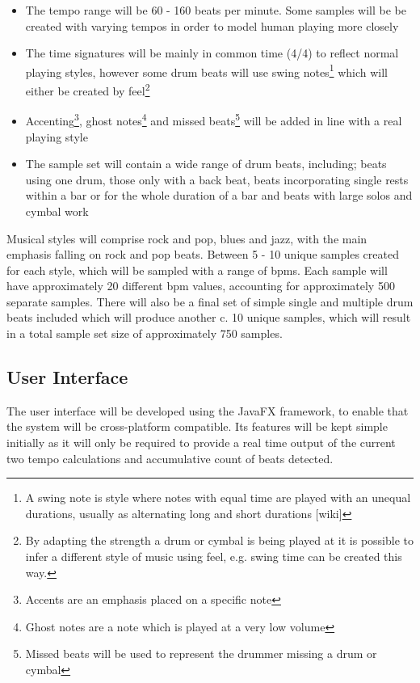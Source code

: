 \documentclass[a4paper, 11pt]{article}
\begin{document}
\begin{itemize}
\item The tempo range will be 60 - 160 beats per minute. Some samples will be be created with varying tempos in order to model human playing more closely
\item The time signatures will be mainly in common time (4/4) to reflect normal playing styles, however some drum beats will use swing notes\footnote{A swing note is style where notes with equal time are played with an unequal durations, usually as alternating long and short durations [wiki]} which will either be created by feel\footnote{By adapting the strength a drum or cymbal is being played at it is possible to infer a different style of music using feel, e.g. swing time can be created this way.}
\item Accenting\footnote{Accents are an emphasis placed on a specific note}, ghost notes\footnote{Ghost notes are a note which is played at a very low volume} and missed beats\footnote{Missed beats will be used to represent the drummer missing a drum or cymbal} will be added in line with a real playing style
\item The sample set will contain a wide range of drum beats, including; beats using one drum, those only with a back beat, beats incorporating single rests within a bar or for the whole duration of a bar and beats with large solos and cymbal work
\end{itemize} 

Musical styles will comprise rock and pop, blues and jazz, with the main emphasis falling on rock and pop beats. Between 5 - 10 unique samples created for each style, which will be sampled with a range of bpms. Each sample will have approximately 20 different bpm values, accounting for approximately 500 separate samples. There will also be a final set of simple single and multiple drum beats included which will produce another c. 10 unique samples, which will result in a total sample set size of approximately 750 samples.

\subsection{User Interface}
The user interface will be developed using the JavaFX framework, to enable that the system will be cross-platform compatible. Its features will be kept simple initially as it will only be required to provide a real time output of the current two tempo calculations and accumulative count of beats detected.
\end{document}

